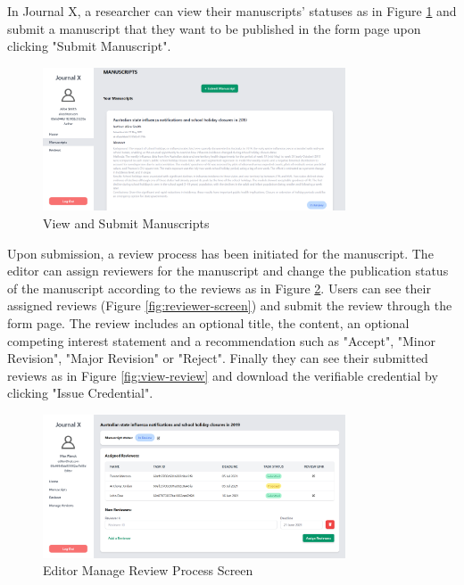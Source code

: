In Journal X, a researcher can view their manuscripts' statuses as in Figure  \ref{fig:submit-manuscript} and submit a manuscript that they want to be published in the form page upon clicking "Submit Manuscript". 

\begin{figure}[htpb]
  \centering
  \includegraphics[width=0.8\textwidth]{figures/submitManuscript.png}
  \caption{View and Submit Manuscripts} \label{fig:submit-manuscript}
\end{figure}

Upon submission, a review process has been initiated for the manuscript. The editor can assign reviewers for the manuscript and change the publication status of the manuscript according to the reviews as in Figure \ref{fig:editor}. Users can see their assigned reviews (Figure \ref{fig:reviewer-screen}) and submit the review through the form page. The review includes an optional title, the content, an optional competing interest statement and a recommendation such as "Accept", "Minor Revision", "Major Revision" or "Reject". Finally they can see their submitted reviews as in Figure \ref{fig:view-review} and download the verifiable credential by clicking "Issue Credential".

\begin{figure}[htpb]
  \centering
  \includegraphics[width=0.8\textwidth]{figures/editor.png}
  \caption{Editor Manage Review Process Screen} \label{fig:editor}
\end{figure}

